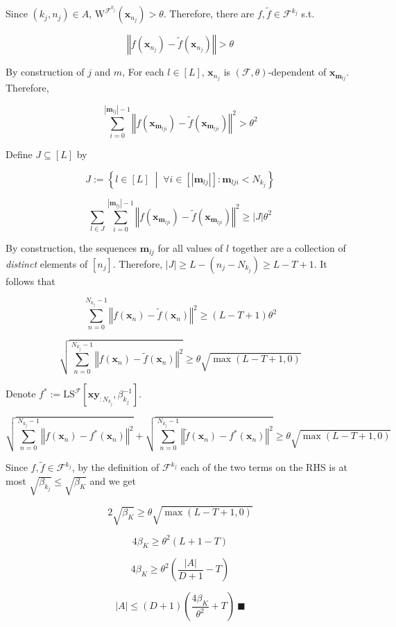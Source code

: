 \documentclass[a4paper]{article}
\newcommand{\Co}[1]{}
\newcommand{\AP}[1]{\left(#1\right)}
\newcommand{\AB}[1]{\left[#1\right]}
\newcommand{\ACM}[2]{\left\{#1\;\middle\vert\;#2\right\}}
\newcommand{\Abs}[1]{\left\vert #1 \right\vert}
\newcommand{\Norm}[1]{\left\Vert #1 \right\Vert}
\newcommand{\F}{\mathcal{F}}
\newcommand{\LS}{\mathrm{LS}}
\newcommand{\W}{\mathrm{W}}
\begin{document}
Since $(k_j,n_j)\in A$, $\W^{\F^{k_j}}\AP{\boldsymbol{x}_{n_j}}>\theta$. Therefore, there are $f,\tilde{f}\in\F^{k_j}$ s.t. 

$$\Norm{f\AP{\boldsymbol{x}_{n_j}}-\tilde{f}\AP{\boldsymbol{x}_{n_j}}}>\theta$$

By construction of $j$ and $m$, For each $l\in[L]$, $\boldsymbol{x}_{n_j}$ is $(\F,\theta)$-dependent of $\boldsymbol{x}_{\boldsymbol{m}_{lj}}$. Therefore,

$$\sum_{i=0}^{\Abs{\boldsymbol{m}_{lj}}-1}\Norm{f\AP{\boldsymbol{x}_{\boldsymbol{m}_{lji}}}-\tilde{f}\AP{\boldsymbol{x}_{\boldsymbol{m}_{lji}}}}^2>\theta^2$$

Define $J\subseteq[L]$ by

$$J:=\ACM{l\in[L]}{\forall i\in\AB{\Abs{\boldsymbol{m}_{lj}}}: \boldsymbol{m}_{lji}<N_{k_j}}$$

$$\sum_{l\in J}\sum_{i=0}^{\Abs{\boldsymbol{m}_{lj}}-1}\Norm{f\AP{\boldsymbol{x}_{\boldsymbol{m}_{lji}}}-\tilde{f}\AP{\boldsymbol{x}_{\boldsymbol{m}_{lji}}}}^2\geq\Abs{J}\theta^2$$

By construction, the sequences $\boldsymbol{m}_{lj}$ for all values of $l$ together are a collection of \textit{distinct}\Co{i} elements of $\AB{n_j}$. Therefore, $\Abs{J}\geq L-\AP{n_j-N_{k_j}}\geq L-T+1$. It follows that

$$\sum_{n=0}^{N_{k_j}-1}\Norm{f\AP{\boldsymbol{x}_n}-\tilde{f}\AP{\boldsymbol{x}_n}}^2\geq(L-T+1)\theta^2$$

$$\sqrt{\sum_{n=0}^{N_{k_j}-1}\Norm{f\AP{\boldsymbol{x}_n}-\tilde{f}\AP{\boldsymbol{x}_n}}^2}\geq\theta\sqrt{\max(L-T+1,0)}$$

Denote $f^*:=\LS^\F\AB{\boldsymbol{xy}_{:N_{k_j}},\beta_{k_j}^{-1}}$.

$$\sqrt{\sum_{n=0}^{N_{k_j}-1}\Norm{f\AP{\boldsymbol{x}_n}-f^*\AP{\boldsymbol{x}_n}}^2}+\sqrt{\sum_{n=0}^{N_{k_j}-1}\Norm{\tilde{f}\AP{\boldsymbol{x}_n}-f^*\AP{\boldsymbol{x}_n}}^2}\geq\theta\sqrt{\max(L-T+1,0)}$$

Since $f,\tilde{f}\in\F^{k_j}$, by the definition of $\F^{k_j}$ each of the two terms on the RHS is at most $\sqrt{\beta_{k_j}}\leq\sqrt{\beta_K}$ and we get

$$2\sqrt{\beta_K} \geq\theta\sqrt{\max(L-T+1,0)}$$

$$4\beta_K \geq \theta^2(L+1-T)$$

$$4\beta_K \geq\theta^2\AP{\frac{\Abs{A}}{D+1}-T}$$

$$\Abs{A}\leq(D+1)\AP{\frac{4\beta_K}{\theta^2}+T}\ \blacksquare$$
\end{document}
